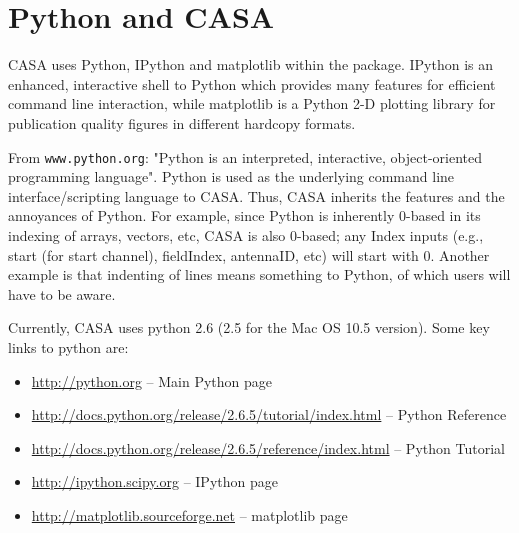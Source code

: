 

\chapter[Appendix: Python and CASA]{Python and CASA}
\label{chapter:python}

CASA uses Python, IPython and matplotlib within the package.
IPython is an enhanced, interactive shell to Python which provides
many features for efficient command line interaction, while
matplotlib is a Python 2-D plotting library for publication quality
figures in different hardcopy formats.

From {\tt www.python.org}: "Python is an interpreted, interactive,
object-oriented programming language".  Python is used as the
underlying command line interface/scripting language to CASA.  
Thus, CASA inherits the features and the annoyances of Python.  
For example, since Python is
inherently 0-based in its indexing of arrays, vectors, etc, CASA is
also 0-based; any Index inputs (e.g., start (for start channel),
fieldIndex, antennaID, etc) will start with 0.  Another example is
that indenting of lines means something to Python, of which users will
have to be aware.

Currently, CASA uses python 2.6 (2.5 for the Mac OS 10.5 version).  Some
key links to python are:

\begin{itemize}
   \item \url{http://python.org}  --  Main Python page
   \item \url{http://docs.python.org/release/2.6.5/tutorial/index.html}  --  Python Reference
   \item \url{http://docs.python.org/release/2.6.5/reference/index.html}  --  Python Tutorial
   \item \url{http://ipython.scipy.org}  --  IPython page
   \item \url{http://matplotlib.sourceforge.net}  --  matplotlib page
\end{itemize}

